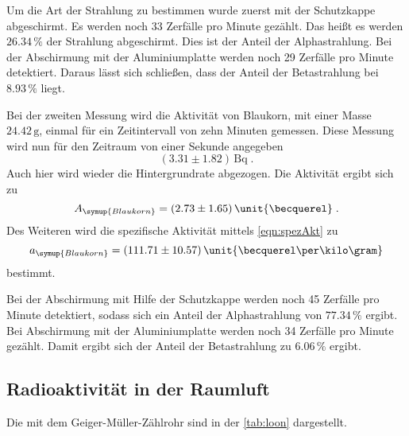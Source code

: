 Um die Art der Strahlung zu bestimmen wurde zuerst mit der Schutzkappe abgeschirmt. Es werden noch 33 Zerfälle pro Minute gezählt. Das heißt es werden
$26.34 \, \%$ der Strahlung abgeschirmt. Dies ist der Anteil der Alphastrahlung. Bei der Abschirmung mit der Aluminiumplatte werden noch 29 
Zerfälle pro Minute detektiert. Daraus lässt sich schließen, dass der Anteil der Betastrahlung bei $8.93 \,\%$ liegt.

Bei der zweiten Messung wird die Aktivität von Blaukorn, mit einer Masse $24.42\,\unit{\gram}$, einmal für ein Zeitintervall von zehn Minuten gemessen.
Diese Messung wird nun für den Zeitraum von einer Sekunde angegeben
\begin{equation*}
    (3.31 \pm 1.82) \,\unit{\becquerel} \; .
\end{equation*}
Auch hier wird wieder die Hintergrundrate abgezogen. Die Aktivität ergibt sich zu 
\begin{equation*}
    A_{\symup{Blaukorn}} = (2.73 \pm 1.65) \, \unit{\becquerel} \; .
\end{equation*}
Des Weiteren wird die spezifische Aktivität mittels \autoref{eqn:spezAkt} zu 
\begin{equation*}
    a_{\symup{Blaukorn}} = (111.71 \pm 10.57) \,\unit{\becquerel \per \kilo\gram}
\end{equation*} 
bestimmt. 

Bei der Abschirmung mit Hilfe der Schutzkappe werden noch 45 Zerfälle pro Minute detektiert, sodass sich ein Anteil der Alphastrahlung von $77.34 \,\%$ 
ergibt. Bei Abschirmung mit der Aluminiumplatte werden noch 34 Zerfälle pro Minute gezählt. Damit ergibt sich der Anteil der Betastrahlung zu 
$6.06 \,\%$ ergibt.

\subsection{Radioaktivität in der Raumluft}
\label{sec:Radioaktivität in der Raumluft}

Die mit dem Geiger-Müller-Zählrohr sind in der \autoref{tab:loon} dargestellt.

